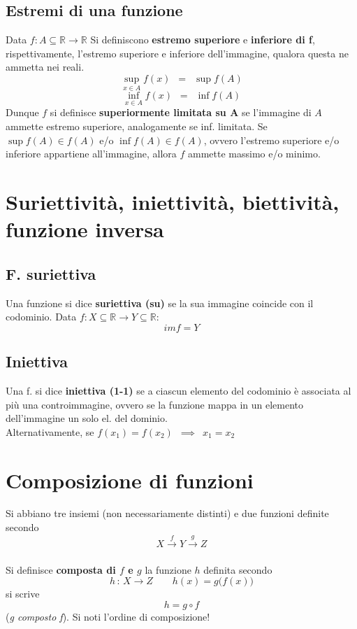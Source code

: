 \documentclass[10pt, oneside]{book}
\theoremstyle{plain}
\begin{document}
\subsection{Estremi di una funzione}
\begin{defin}
Data $f :  A \subseteq \mathbb{R} \rightarrow \mathbb{R}$ Si definiscono \textbf{estremo superiore} e \textbf{inferiore di f}, rispettivamente, l'estremo superiore e inferiore dell'immagine, qualora questa ne ammetta nei reali.
\[\sup \limits_{x \in A} f(x) \enspace = \enspace \sup f(A)\]
\[\inf \limits_{x \in A} f(x) \enspace = \enspace \inf f(A)\]
Dunque $f$ si definisce \textbf{superiormente limitata su A} se l'immagine di $A$ ammette estremo superiore, analogamente se inf. limitata. Se $\sup f(A) \in f(A)$ e/o $\inf f(A) \in f(A)$, ovvero l'estremo superiore e/o inferiore appartiene all'immagine, allora $f$ ammette massimo e/o minimo.
\end{defin}
\section{Suriettività, iniettività, biettività, funzione inversa}
\subsection{F. suriettiva}
\begin{defin}
Una funzione si dice \textbf{suriettiva (su)} se la sua immagine coincide con il codominio. Data $f : X \subseteq \mathbb{R} \rightarrow Y \subseteq \mathbb{R}$:
\[im f = Y\]
\end{defin}
\subsection{Iniettiva}
\begin{defin}
Una f. si dice \textbf{iniettiva (1-1)} se a ciascun elemento del codominio è associata al più una controimmagine, ovvero se la funzione mappa in un elemento dell'immagine un solo el. del dominio.
\\Alternativamente, se $f(x_1) = f(x_2) \enspace \implies \enspace x_1 = x_2$
\end{defin}

\section{Composizione di funzioni}
Si abbiano tre insiemi (non necessariamente distinti) e due funzioni definite secondo
\[X \xrightarrow[]{f} Y \xrightarrow[]{g} Z\]
\begin{defin}
Si definisce \textbf{composta di $f$ e $g$} la funzione $h$ definita secondo
\[h \, : \, X \rightarrow Z \qquad h(x) = g \big(f(x)\big)\]
si scrive
\[h = g \circ f\]
(\textit{g composto f}). Si noti l'ordine di composizione!
\end{defin}
\end{document}
